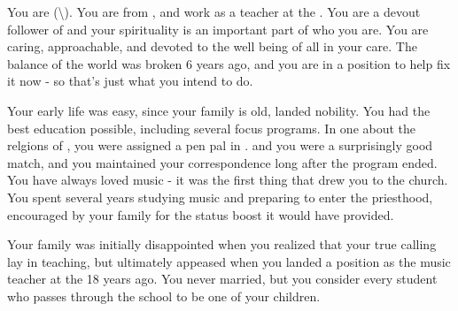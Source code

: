 \documentclass[char]{GL2020}
\begin{document}
\name{\cMusic{}}



You are \cMusic{} (\cMusic{\they}\textbackslash\cMusic{\them}). You are from \pFarm{}, and work as a teacher at the \pSchool{}. You are a devout follower of \cFarmGod{} and your spirituality is an important part of who you are. You are caring, approachable, and devoted to the well being of all in your care. The balance of the world was broken 6 years ago, and you are in a position to help fix it now - so that's just what you intend to do.



Your early life was easy, since your family is old, landed nobility. You had the best education possible, including several focus programs. In one about the relgions of \pEarth{}, you were assigned a pen pal in \pTech{}. \cBeetle{} and you were a surprisingly good match, and you maintained your correspondence long after the program ended. You have always loved music - it was the first thing that drew you to the church. You spent several years studying music and preparing to enter the priesthood, encouraged by your family for the status boost it would have provided. 

Your family was initially disappointed when you realized that your true calling lay in teaching, but ultimately appeased when you landed a position as the music teacher at the \pSchool{} 18 years ago. You never married, but you consider every student who passes through the school to be one of your children.

\end{document}
